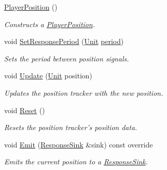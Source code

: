 \begin{DoxyCompactItemize}
\item 
\hypertarget{classPlayerPosition_a707498560b9f9189fb6d3cd8e59b77d7}{\hyperlink{classPlayerPosition_a707498560b9f9189fb6d3cd8e59b77d7}{Player\+Position} ()}\label{classPlayerPosition_a707498560b9f9189fb6d3cd8e59b77d7}

\begin{DoxyCompactList}\small\item\em Constructs a \hyperlink{classPlayerPosition}{Player\+Position}. \end{DoxyCompactList}\item 
void \hyperlink{classPlayerPosition_aee2fec4f9cd5db48ee1ed79044c658ab}{Set\+Response\+Period} (\hyperlink{classPlayerPosition_a535c99057ceca21d8fbe82883c592a66}{Unit} \hyperlink{classPlayerPosition_a59fceae86a59fb8ad1fb4e93160f948c}{period})
\begin{DoxyCompactList}\small\item\em Sets the period between position signals. \end{DoxyCompactList}\item 
void \hyperlink{classPlayerPosition_ad39cab72590804238d2384391cb65745}{Update} (\hyperlink{classPlayerPosition_a535c99057ceca21d8fbe82883c592a66}{Unit} position)
\begin{DoxyCompactList}\small\item\em Updates the position tracker with the new position. \end{DoxyCompactList}\item 
void \hyperlink{classPlayerPosition_a813e8eb40fdff815683fb7a5b1671ede}{Reset} ()
\begin{DoxyCompactList}\small\item\em Resets the position tracker's position data. \end{DoxyCompactList}\item 
void \hyperlink{classPlayerPosition_a66963c28fd9dffe0fd7338023310fa92}{Emit} (\hyperlink{classResponseSink}{Response\+Sink} \&sink) const override
\begin{DoxyCompactList}\small\item\em Emits the current position to a \hyperlink{classResponseSink}{Response\+Sink}. \end{DoxyCompactList}\end{DoxyCompactItemize}
